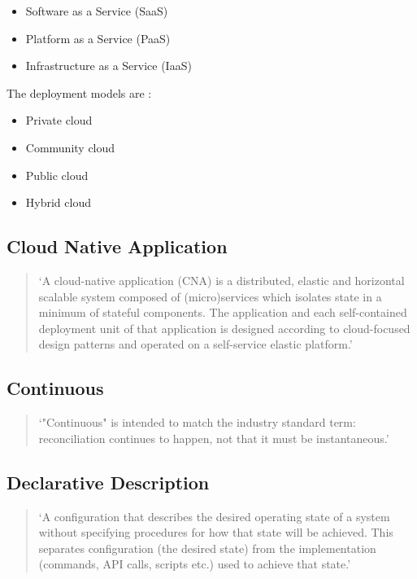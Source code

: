 \begin{itemize}
	\item Software as a Service (SaaS)
	\item Platform as a Service (PaaS)
	\item Infrastructure as a Service (IaaS)
\end{itemize}

The deployment models are
\autocite{cloudComputingNistDefinition2011}:

\begin{itemize}
	\item Private cloud
	\item Community cloud
	\item Public cloud
	\item Hybrid cloud
\end{itemize}

\subsection*{Cloud Native Application}

\begin{quotation}
\noindent
\enquote*{A cloud-native application (CNA) is a distributed, elastic and horizontal scalable system composed of (micro)services which isolates state in a
minimum of stateful components. The application and each self-contained
deployment unit of that application is designed according to cloud-focused
design patterns and operated on a self-service elastic platform.}
\autocite{cloudNativeApplicationDefinition2017}
\end{quotation}

\subsection*{Continuous}
\begin{quotation}
\noindent
\enquote*{"Continuous" is intended to match the industry standard term: reconciliation continues to happen, not that it must be instantaneous.}
\autocite{gitopsGlossary}
\end{quotation}

\subsection*{Declarative Description}
\begin{quotation}
\noindent
\enquote*{A configuration that describes the desired operating state of a system without specifying procedures for how that state will be achieved. This separates configuration (the desired state) from the implementation (commands, API calls, scripts etc.) used to achieve that state.}
\autocite{gitopsGlossary}
\end{quotation}

